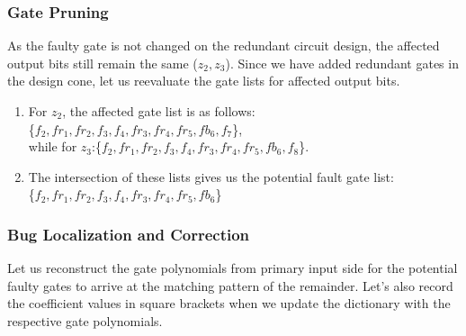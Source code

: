 \documentclass{article}
\begin{document}
\subsubsection{Gate Pruning}
As the faulty gate is not changed on the redundant circuit design, the affected output bits still remain the same ($z_2,z_3$). Since we have added redundant gates in the design cone, let us reevaluate the gate lists for affected output bits.  
\begin{enumerate}
    \item For $z_2$, the affected gate list is as follows: \\
     \{$f_2,fr_1,fr_2,f_3,f_4,fr_3,fr_4,fr_5,fb_6,f_7$\}, \\
     while for $z_3$:\{$f_2,fr_1,fr_2,f_3,f_4,fr_3,fr_4,fr_5,fb_6,f_8$\}.
    \item The intersection of these lists gives us the potential fault gate list: \\
    \{$f_2,fr_1,fr_2,f_3,f_4,fr_3,fr_4,fr_5,fb_6$\}
\end{enumerate}

\subsubsection{Bug Localization and Correction}
Let us reconstruct the gate polynomials from primary input side for the potential faulty gates to arrive at the matching pattern of the remainder. Let's also record the coefficient values in square brackets when we update the dictionary with the respective gate polynomials.
\end{document}
